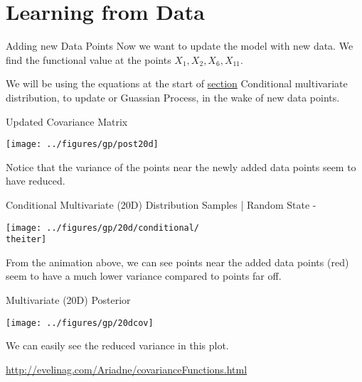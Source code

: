 \documentclass{beamer}
\begin{document}
	\section{Learning from Data}
	
	\begin{frame}{Adding new Data Points}
		Now we want to update the model with new data. We find the functional value at the points $X_1, X_2, X_6, X_{11}$.
		
		We will be using the equations at the start of \hyperref[sec:condMul]{section} Conditional multivariate distribution, to update or Guassian Process, in the wake of new data points.
	\end{frame}
	
	\begin{frame}{Updated Covariance Matrix}
		\begin{center}
			\texttt{[image: ../figures/gp/post20d]}
		\end{center}
		Notice that the variance of the points near the newly added data points seem to have reduced.
	\end{frame}
	
	{%
		\begin{frame}{Conditional Multivariate (20D) Distribution Samples | Random State - \theiter}
			\begin{center}
				\texttt{[image: ../figures/gp/20d/conditional/\\theiter]}
			\end{center}
			From the animation above, we can see points near the added data points (red) seem to have a much lower variance compared to points far off.
		\end{frame}
	}
	
	\begin{frame}{Multivariate (20D) Posterior}
		\begin{center}
			\texttt{[image: ../figures/gp/20dcov]} \\
		\end{center}
		We can easily see the reduced variance in this plot.
	\end{frame}
	
	\urldef\urlsek\url{http://evelinag.com/Ariadne/covarianceFunctions.html}
\end{document}
